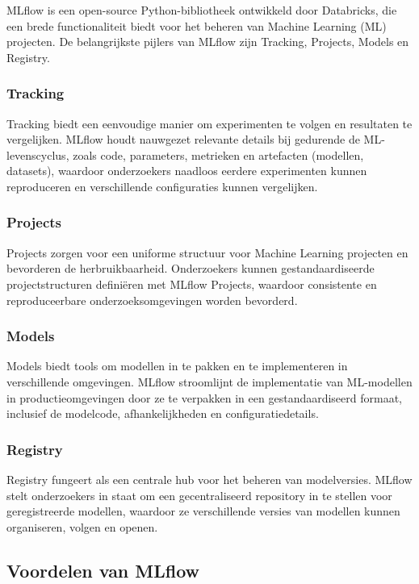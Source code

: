 \textcite{MLflow2023} MLflow is een open-source Python-bibliotheek ontwikkeld door Databricks, die een brede functionaliteit biedt voor het beheren van Machine Learning (ML) projecten. De belangrijkste pijlers van MLflow zijn Tracking, Projects, Models en Registry.

\subsubsection{Tracking}
Tracking biedt een eenvoudige manier om experimenten te volgen en resultaten te vergelijken. MLflow houdt nauwgezet relevante details bij gedurende de ML-levenscyclus, zoals code, parameters, metrieken en artefacten (modellen, datasets), waardoor onderzoekers naadloos eerdere experimenten kunnen reproduceren en verschillende configuraties kunnen vergelijken.

\subsubsection{Projects}
Projects zorgen voor een uniforme structuur voor Machine Learning projecten en bevorderen de herbruikbaarheid. Onderzoekers kunnen gestandaardiseerde projectstructuren definiëren met MLflow Projects, waardoor consistente en reproduceerbare onderzoeksomgevingen worden bevorderd.

\subsubsection{Models}
Models biedt tools om modellen in te pakken en te implementeren in verschillende omgevingen. MLflow stroomlijnt de implementatie van ML-modellen in productieomgevingen door ze te verpakken in een gestandaardiseerd formaat, inclusief de modelcode, afhankelijkheden en configuratiedetails.

\subsubsection{Registry}
Registry fungeert als een centrale hub voor het beheren van modelversies. MLflow stelt onderzoekers in staat om een gecentraliseerd repository in te stellen voor geregistreerde modellen, waardoor ze verschillende versies van modellen kunnen organiseren, volgen en openen.

\subsection{Voordelen van MLflow}

